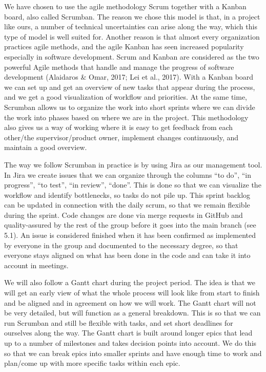 We have chosen to use the agile methodology Scrum together with a Kanban board, also called Scrumban. The reason we chose this model is that, in a project like ours, a number of technical uncertainties can arise along the way, which this type of model is well suited for. Another reason is that almost every organization practices agile methods, and the agile Kanban has seen increased popularity especially in software development. Scrum and Kanban are considered as the two powerful Agile methods that handle and manage the progress of software development (Alaidaros \& Omar, 2017; Lei et al., 2017). With a Kanban board we can set up and get an overview of new tasks that appear during the process, and we get a good visualization of workflow and priorities. At the same time, Scrumban allows us to organize the work into short sprints where we can divide the work into phases based on where we are in the project. This methodology also gives us a way of working where it is easy to get feedback from each other/the supervisor/product owner, implement changes continuously, and maintain a good overview.

The way we follow Scrumban in practice is by using Jira as our management tool. In Jira we create issues that we can organize through the columns ``to do'', ``in progress'', ``to test'', ``in review'', ``done''. This is done so that we can visualize the workflow and identify bottlenecks, so tasks do not pile up. This sprint backlog can be updated in connection with the daily scrum, so that we remain flexible during the sprint. Code changes are done via merge requests in GitHub and quality-assured by the rest of the group before it goes into the main branch (see 5.1). An issue is considered finished when it has been confirmed as implemented by everyone in the group and documented to the necessary degree, so that everyone stays aligned on what has been done in the code and can take it into account in meetings.

We will also follow a Gantt chart during the project period. The idea is that we will get an early view of what the whole process will look like from start to finish and be aligned and in agreement on how we will work. The Gantt chart will not be very detailed, but will function as a general breakdown. This is so that we can run Scrumban and still be flexible with tasks, and set short deadlines for ourselves along the way. The Gantt chart is built around longer epics that lead up to a number of milestones and takes decision points into account. We do this so that we can break epics into smaller sprints and have enough time to work and plan/come up with more specific tasks within each epic.

